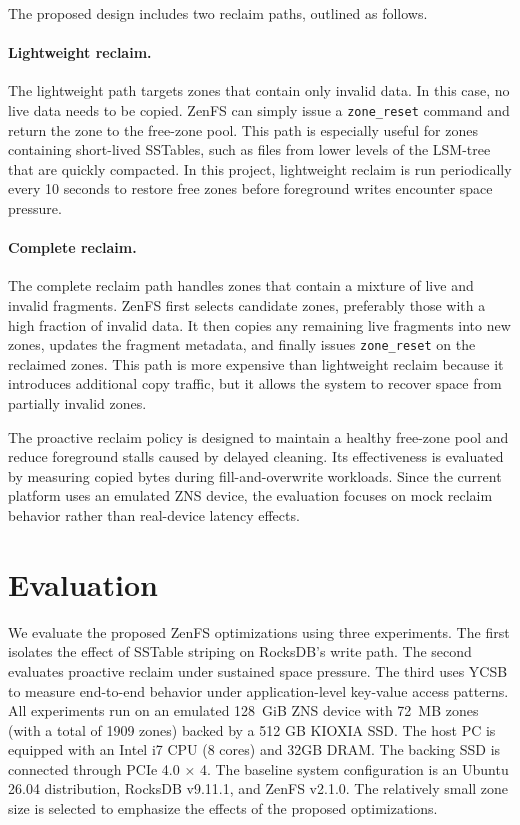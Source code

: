 \documentclass[letterpaper,twocolumn,10pt]{article}
\begin{document}
The proposed design includes two reclaim paths, outlined as follows.
\paragraph{Lightweight reclaim.}
The lightweight path targets zones that contain only invalid data. In this case, no live data needs to be copied. ZenFS can simply issue a \texttt{zone\_reset} command and return the zone to the free-zone pool. This path is especially useful for zones containing short-lived SSTables, such as files from lower levels of the LSM-tree that are quickly compacted. In this project, lightweight reclaim is run periodically every 10 seconds to restore free zones before foreground writes encounter space pressure.

\paragraph{Complete reclaim.}
The complete reclaim path handles zones that contain a mixture of live and invalid fragments. ZenFS first selects candidate zones, preferably those with a high fraction of invalid data. It then copies any remaining live fragments into new zones, updates the fragment metadata, and finally issues \texttt{zone\_reset} on the reclaimed zones. This path is more expensive than lightweight reclaim because it introduces additional copy traffic, but it allows the system to recover space from partially invalid zones.

The proactive reclaim policy is designed to maintain a healthy free-zone pool and reduce foreground stalls caused by delayed cleaning. Its effectiveness is evaluated by measuring copied bytes during fill-and-overwrite workloads. Since the current platform uses an emulated ZNS device, the evaluation focuses on mock reclaim behavior rather than real-device latency effects.

\section{Evaluation}
We evaluate the proposed ZenFS optimizations using three experiments. The first isolates the effect of SSTable striping on RocksDB's write path. The second evaluates proactive reclaim under sustained space pressure. The third uses YCSB to measure end-to-end behavior under application-level key-value access patterns. All experiments run on an emulated 128~GiB ZNS device with 72~MB zones (with a total of 1909 zones) backed by a 512 GB KIOXIA SSD. The host PC
is equipped with an Intel i7 CPU (8 cores) and 32GB
DRAM. The backing SSD is connected through PCIe 4.0 × 4. The baseline system configuration is an Ubuntu
26.04 distribution, RocksDB v9.11.1, and
ZenFS v2.1.0. The relatively small zone size is selected to emphasize the effects of the proposed optimizations. 
\end{document}
